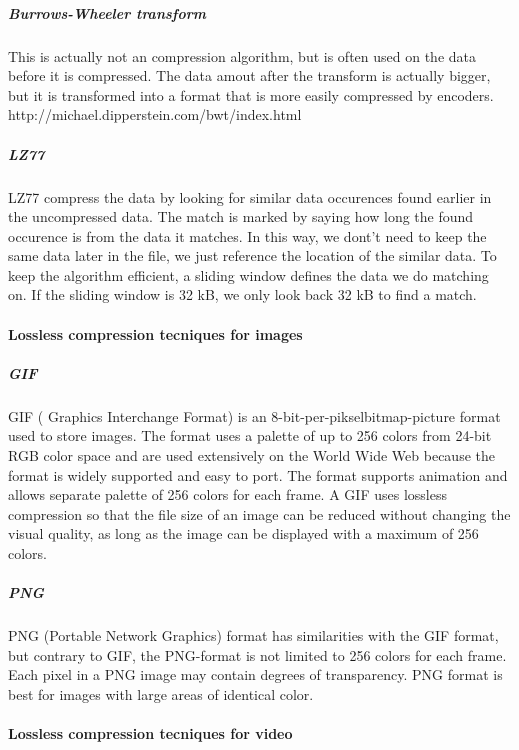 \subparagraph{Burrows-Wheeler transform } \hfill
\newline
This is actually not an compression algorithm, but is often used on the data before it is compressed. The data amout after the transform is actually bigger, but it is transformed into a format that is more easily compressed by encoders. http://michael.dipperstein.com/bwt/index.html
\cite{bib:burrowsWheelerTransform}

\pagebreak

\subparagraph{LZ77} \hfill
\newline
LZ77 compress the data by looking for similar data occurences found earlier in the uncompressed data. The match is marked by saying how long the found occurence is from the data it matches. In this way, we dont't need to keep the same data later in the file, we just reference the location of the similar data. To keep the algorithm efficient, a sliding window defines the data we do matching on. If the sliding window is 32 kB, we only look back 32 kB to find a match.
\cite{bib:LZ77}

\paragraph{Lossless compression tecniques for images}
\subparagraph{GIF} \hfill
\newline
GIF ( Graphics Interchange Format) is an 8-bit-per-pikselbitmap-picture format used to store images. The format uses a palette of up to 256 colors from 24-bit RGB color space and are used extensively on the World Wide Web because the format is widely supported and easy to port. The format supports animation and allows separate palette of 256 colors for each frame. A GIF uses lossless compression so that the file size of an image can be reduced without changing the visual quality, as long as the image can be displayed with a maximum of 256 colors. \cite{bib:GIF} \cite{bib:gifSicle}

\subparagraph{PNG} \hfill
\newline
PNG (Portable Network Graphics) format has similarities with the GIF format, but contrary to GIF, the PNG-format is not limited to 256 colors for each frame. Each pixel in a PNG image may contain degrees of transparency. PNG format is best for images with large areas of identical color. \cite{bib:PNG}

\paragraph{Lossless compression tecniques for video}

